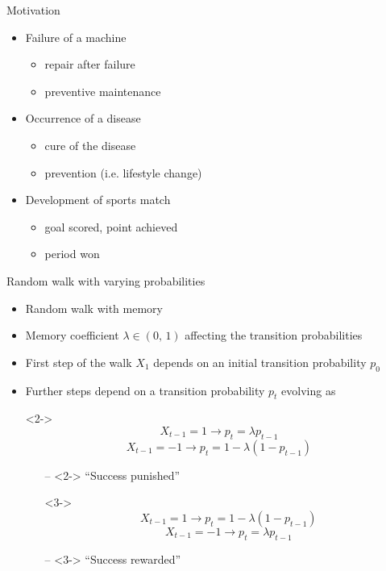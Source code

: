 \documentclass[american]{beamer}
\begin{document}
    \begin{frame}{Motivation}
        \begin{itemize}
            \item Failure of a machine
            \begin{itemize}
                \item repair after failure
                \item preventive maintenance
            \end{itemize}
            \item Occurrence of a disease
            \begin{itemize}
                \item cure of the disease
                \item prevention (i.e. lifestyle change)
            \end{itemize}
            \item Development of sports match
            \begin{itemize}
                \item goal scored, point achieved
                \item period won
            \end{itemize}
        \end{itemize}
    \end{frame}

    \begin{frame}{Random walk with varying probabilities}
        \begin{itemize}
            \item Random walk with memory
            \item Memory coefficient $\lambda\in(0,\,1)$ affecting the transition probabilities
            \item First step of the walk $X_{1}$ depends on an initial transition probability $p_{0}$
            \item Further steps depend on a transition probability $p_{t}$ evolving as
            \item[] <2->
            \[
                X_{t-1}=1\rightarrow p_{t}=\lambda p_{t-1}
            \]
            \[
                X_{t-1}=-1\rightarrow p_{t}=1-\lambda(1-p_{t-1})
            \]

            \begin{itemize}
                \item[--]<2-> ``Success punished''
                \item[] <3->\[
                    X_{t-1}=1\rightarrow p_{t}=1-\lambda(1-p_{t-1})
                \]
                \[
                    X_{t-1}=-1\rightarrow p_{t}=\lambda p_{t-1}
                \]
                \item[--]<3-> ``Success rewarded''
            \end{itemize}
        \end{itemize}
    \end{frame}
\end{document}
